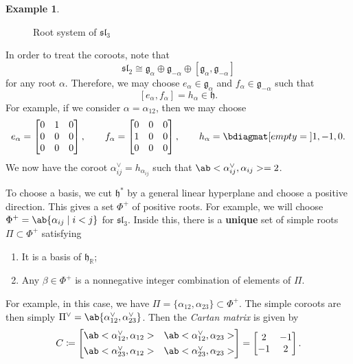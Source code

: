 \documentclass{amsart}
\theoremstyle{definition}
\newtheorem{exm}[thm]{Example}
\theoremstyle{remark}
\theoremstyle{plain}
\theoremstyle{definition}
\theoremstyle{remark}
\newcommand{\R}{\mathbb{R}}
\newcommand{\g}{\mathfrak{g}}
\newcommand{\h}{\mathfrak{h}}
\newcommand{\mf}[1]{\mathfrak{#1}}
\newcommand{\1}{\mathbf{1}}
\newcommand{\2}{\mathbf{2}}
\newcommand{\3}{\mathbf{3}}
\renewcommand{\sl}{\mf{sl}}
\begin{document}
\begin{exm}
\begin{figure}[htpb]
\begin{center}
    \end{center}
    \caption{Root system of \(\sl_3\)}%
    \label{fig:sl3-roots}
    \end{figure}

    In order to treat the coroots, note that
    \[ \sl_2 \cong \g_{\alpha} \oplus \g_{-\alpha} \oplus [\g_{\alpha}, \g_{-\alpha}] \]
    for any root \(\alpha\). Therefore, we may choose \(e_{\alpha} \in \g_{\alpha}\) and \(f_{\alpha} \in \g_{-\alpha}\) such that
    \[ [e_{\alpha}, f_{\alpha}] = h_{\alpha} \in \h. \]
    For example, if we consider \(\alpha = \alpha_{12}\), then we may choose
    \[ e_{\alpha} = \begin{bmatrix}
        0 & 1 & 0 \\
        0 & 0 & 0 \\
        0 & 0 & 0
    \end{bmatrix}, \qquad f_{\alpha} = \begin{bmatrix}
        0 & 0 & 0 \\
        1 & 0 & 0 \\
        0 & 0 & 0
    \end{bmatrix}, \qquad h_{\alpha} = \bdiagmat[empty={}]{1,-1,0}. \]
    We now have the coroot \(\alpha_{ij}^{\vee} = h_{\alpha_{ij}}\) such that 
    \( \ab<\alpha_{ij}^{\vee}, \alpha_{ij}> = 2 \). 

    To choose a basis, we cut \(\h^*\) by a general linear hyperplane and choose a positive direction. This gives a set $\Phi^+$ of positive roots. For example, we will choose \(\Phi^+ = \ab\{ \alpha_{ij} \mid i < j\}\) for \(\sl_3\). Inside this, there is a \textbf{unique} set of simple roots \(\Pi \subset \Phi^+\) satisfying
    \begin{enumerate}
        \item It is a basis of \(\h_{\R}\);
        \item Any \(\beta \in \Phi^+\) is a nonnegative integer combination of elements of \(\Pi\).
    \end{enumerate}
    For example, in this case, we have \(\Pi = \{\alpha_{12}, \alpha_{23}\} \subset \Phi^+ \). The simple coroots are then simply \(\Pi^{\vee} = \ab\{ \alpha_{12}^{\vee}, \alpha_{23}^{\vee} \} \).
    Then the \textit{Cartan matrix} is given by
    \[ C \coloneqq \begin{bmatrix}
        \ab<\alpha_{12}^{\vee}, \alpha_{12}> & \ab<\alpha_{12}^{\vee}, \alpha_{23}> \\[4pt]
        \ab<\alpha_{23}^{\vee}, \alpha_{12}> & \ab<\alpha_{23}^{\vee}, \alpha_{23}>
    \end{bmatrix} = \begin{bmatrix}
        2 & -1 \\
        -1 & 2
    \end{bmatrix}. \]


\end{exm}
\end{document}
